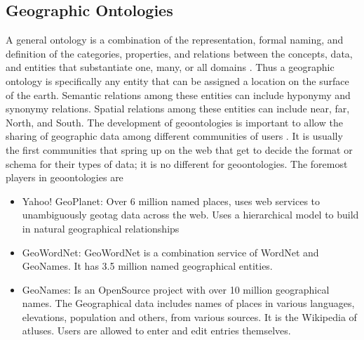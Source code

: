 \documentclass[10pt, conference, compsocconf]{IEEEtran}
\begin{document}
\subsection{Geographic Ontologies}
A general ontology is a combination of the representation, formal naming, and definition of the categories, properties, and relations between the concepts, data, and entities that substantiate one, many, or all domains \cite{Buttcher:2016vr}. Thus a geographic ontology is specifically any entity that can be assigned a location on the surface of the earth. Semantic relations among these entities can include hyponymy and synonymy relations. Spatial relations among these entities can include near, far, North, and South. The development of geoontologies is important to allow the sharing of geographic data among different communities of users \cite{Fang:2018jc}. It is usually the first communities that spring up on the web that get to decide the format or schema for their types of data; it is no different for geoontologies. The foremost players in geoontologies are 
\begin{itemize}
    \item Yahoo! GeoPlanet: Over 6 million named places, uses web services to unambiguously geotag data across the web. Uses a hierarchical model to build in natural geographical relationships
    \item GeoWordNet: GeoWordNet is a combination service of WordNet and GeoNames. It has 3.5 million named geographical entities.
    \item  GeoNames: Is an OpenSource project with over 10 million geographical names. The Geographical data includes names of places in various languages, elevations, population and others, from various sources. It is the Wikipedia of atluses. Users are allowed to enter and edit entries themselves.
\end{itemize}
\end{document}
